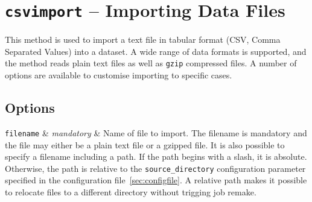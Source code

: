 
\section{\texttt{csvimport} -- Importing Data Files}

This method is used to import a text file in tabular format (CSV,
Comma Separated Values) into a dataset.  A wide range of data formats
is supported, and the method reads plain text files as well as
\texttt{gzip} compressed files.  A number of options are available to
customise importing to specific cases.


\subsection{Options}

\starttable
  \RP \texttt{filename} & \emph{mandatory} & Name of file to import.  The
  filename is mandatory and the file may either be a plain text file
  or a gzipped file.  It is also possible to specify a filename
  including a path.  If the path begins with a slash, it is absolute.
  Otherwise, the path is relative to the \texttt{source\_directory}
  configuration parameter specified in the configuration
  file~\ref{sec:configfile}.  A relative path makes it
  possible to relocate files to a different directory without trigging
  job remake.\\
  
